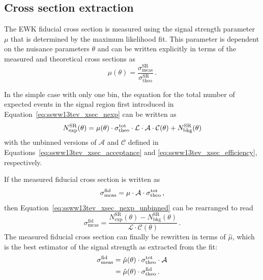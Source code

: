 \subsection{Cross section extraction}\label{ssww13tev:xsec_method}
The \ssww EWK fiducial cross section is measured using the signal strength parameter $\mu$ that is determined by the maximum likelihood fit.
This parameter is dependent on the nuisance parameters $\theta$ and can be written explicitly in terms of the measured and theoretical cross sections as
\begin{equation}
  \mu(\theta) = \frac{\sigma_{\textrm{meas}}^{\textrm{SR}}}{\sigma_{\textrm{theo}}^{\textrm{SR}}}\,.
  \label{eq:ssww13tev_xsec_mu}
\end{equation}

In the simple case with only one bin, the equation for the total number of expected events in the signal region first introduced in Equation~\ref{eq:ssww13tev_xsec_nexp} can be written as
\begin{equation}
  N_{\textrm{exp}}^{\textrm{SR}}(\theta) = \mu(\theta)\cdot\sigmatottheo\cdot\mathcal{L}\cdot\mathcal{A}\cdot\mathcal{C}(\theta)+N_{\textrm{bkg}}^{\textrm{SR}}(\theta)
  \label{eq:ssww13tev_xsec_nexp_unbinned}
\end{equation}
with the unbinned versions of $\mathcal{A}$ and $\mathcal{C}$ defined in Equations~\ref{eq:ssww13tev_xsec_acceptance} and \ref{eq:ssww13tev_xsec_efficiency}, respectively.

If the measured fiducial cross section is written as
\begin{equation}
  \sigma_{\textrm{meas}}^{\textrm{fid}} = \mu\cdot\mathcal{A}\cdot\sigma_{\textrm{theo}}^{\textrm{tot}}\,,
\end{equation}
then Equation~\ref{eq:ssww13tev_xsec_nexp_unbinned} can be rearranged to read
\begin{equation}
  \sigma_{\textrm{meas}}^{\textrm{fid}} = \frac{N_{\textrm{exp}}^{\textrm{SR}}(\theta)-N_{\textrm{bkg}}^{\textrm{SR}}(\theta)}{\mathcal{L}\cdot\mathcal{C}(\theta)}\,.
  \label{eq:ssww13tev_xsec_fid_meas}
\end{equation}
The measured fiducial cross section can finally be rewritten in terms of $\hat{\mu}$, which is the best estimator of the signal strength as extracted from the fit:
\begin{equation}
  \begin{aligned}
    \sigma_{\textrm{meas}}^{\textrm{fid}} &= \hat{\mu}(\theta)\cdot\sigmatottheo\cdot\mathcal{A}\\
    &= \hat{\mu}(\theta)\cdot\sigma_{\textrm{theo}}^{\textrm{fid}}\,.
  \end{aligned}
  \label{eq:ssww13tev_xsec_fid_meas_mu}
\end{equation}


